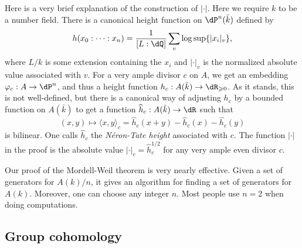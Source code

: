 Here is a very brief explanation of the construction of $|\cdot|$. Here we 
require $k$ to be a number field. There is a canonical height function on 
$\dP^n(\bar k)$ defined by  
\[
  h(x_0:\cdots:x_n) = \frac{1}{[L:\dQ]} \sum_v \log \sup\{|x_i|_v\} \text{,}
\]
where $L/k$ is some extension containing the $x_i$ and $|\cdot|_v$ is the 
normalized absolute value associated with $v$. For a very ample divisor $c$ on 
$A$, we get an embedding $\varphi_c:A\to \dP^n$, and thus a height function 
$h_c:A(\bar k)\to \dR_{\geqslant 0}$. As it stands, this is not well-defined, 
but there is a canonical way of adjusting $h_c$ by a bounded function on 
$A(\bar k)$ to get a function $\widehat h_c:A(\bar k)\to \dR$ such that 
\[
  (x,y)\mapsto \langle x,y\rangle_c = \widehat h_c(x+y) - \widehat h_c(x) - \widehat h_c(y)
\]
is bilinear. One calls $\widehat h_c$ the \emph{N\'eron-Tate height} associated 
with $c$. The function $|\cdot|$ in the proof is the absolute value 
$|\cdot|_c=\widehat h_c^{1/2}$ for any very ample even divisor $c$.





Our proof of the Mordell-Weil theorem is very nearly effective. Given a set of 
generators for 
$A(k)/n$, it gives an algorithm for finding a set of generators for 
$A(k)$. Moreover, one can choose any integer $n$. Most people use $n = 2$ when doing 
computations. 











\subsection{Group cohomology}

